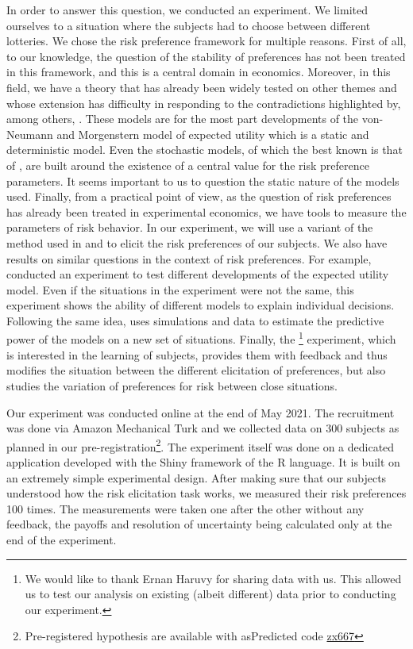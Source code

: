 \documentclass[
]{book}
\begin{document}
In order to answer this question, we conducted an experiment. We
limited ourselves to a situation where the subjects had to choose
between different lotteries. We chose the risk preference framework for
multiple reasons. First of all, to our knowledge, the question of the
stability of preferences has not been treated in this framework, and
this is a central domain in economics. Moreover, in this field, we have
a theory that has already been widely tested on other themes and whose
extension has difficulty in responding to the contradictions highlighted
by, among others, \citet{friedman2014risky}. These models are for the most part
developments of the von-Neumann and Morgenstern model of expected
utility which is a static and deterministic model. Even the stochastic
models, of which the best known is that of \citet{luce2012individual}, are
built around the existence of a central value for the risk preference
parameters. It seems important to us to question the static nature of
the models used. Finally, from a practical point of view, as the
question of risk preferences has already been treated in experimental
economics, we have tools to measure the parameters of risk behavior. In
our experiment, we will use a variant of the method used in
\citet{lejuez2002evaluation} and \citet{crosetto2013bomb} to elicit the risk
preferences of our subjects. We also have results on similar questions
in the context of risk preferences. For example, \citet{hey1994investigating}
conducted an experiment to test different developments of the expected
utility model. Even if the situations in the experiment were not the
same, this experiment shows the ability of different models to explain
individual decisions. Following the same idea, \citet{wilcox2007predicting}
uses simulations and \citet{hey1994investigating} data to estimate the
predictive power of the models on a new set of situations. Finally, the
\citet{ert2017revisiting}\footnote{We would like to thank Ernan Haruvy for sharing data with us. This allowed us to test our analysis on existing (albeit different) data prior to conducting our experiment.} experiment, which is interested in the learning
of subjects, provides them with feedback and thus modifies the situation
between the different elicitation of preferences, but also studies the
variation of preferences for risk between close situations.

Our experiment was conducted online at the end of May 2021.
The recruitment was done via Amazon Mechanical Turk and we collected data on
300 subjects as planned in our pre-registration\footnote{Pre-registered hypothesis are available with asPredicted code
  \href{https://aspredicted.org/zx667.pdf}{zx667}}.
The experiment itself was done on a dedicated application developed with the
Shiny framework of the R language.
It is built on an extremely simple experimental design. After making sure
that our subjects understood how the risk elicitation task works, we
measured their risk preferences 100 times.
The measurements were taken one after the other without any feedback, the
payoffs and resolution of uncertainty being calculated only at the end of the
experiment.
\end{document}
